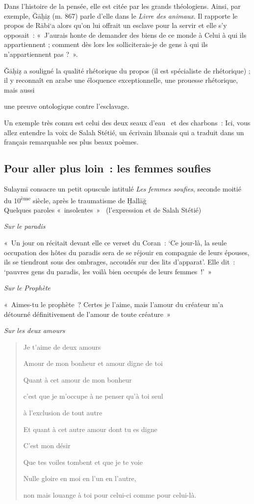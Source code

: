 Dans l'histoire de la pensée, elle est citée par les grands théologiens.
Ainsi, par exemple, Ğāḥiẓ (m. 867) parle d'elle dans le \emph{Livre des
animaux}. Il rapporte le propos de Rābi`a alors qu'on lui offrait un
esclave pour la servir et elle s'y opposait~: «~J'aurais honte de
demander des biens de ce monde à Celui à qui ils appartiennent ; comment
dès lors les solliciterais-je de gens à qui ils n'appartiennent pas ?~».

Ǧāḥiẓ a souligné la qualité rhétorique du propos (il est spécialiste de
rhétorique) ; il y reconnaît en arabe une éloquence exceptionnelle, une
prouesse rhétorique, mais aussi

une preuve ontologique contre l'esclavage.

Un exemple très connu est celui des deux seaux d'eau~ et des charbons~:
Ici, vous allez entendre la voix de Salah Stétié, un écrivain libanais
qui a traduit dans un français remarquable ses plus beaux poèmes.


\subsection{Pour aller plus loin~: les femmes soufies}

Sulaymī consacre un petit opuscule intitulé \emph{Les femmes soufies},
seconde moitié du 10\textsuperscript{ème} siècle, après le traumatisme
de Ḥallāğ \\


Quelques paroles «~insolentes~»~ (l'expression et de Salah Stétié)

\emph{Sur le paradis}

«~Un jour on récitait devant elle ce verset du Coran~: `Ce jour-là, la
seule occupation des hôtes du paradis sera de se réjouir en compagnie de
leurs épouses, ils se tiendront sous des ombrages, accoudés sur des lits
d'apparat'. Elle dit~: `pauvres gens du paradis, les voilà bien occupés
de leurs femmes~!'~»

\emph{Sur le Prophète}~

«~Aimes-tu le prophète~? Certes je l'aime, mais l'amour du créateur m'a
détourné définitivement de l'amour de toute créature~»

\emph{Sur les deux amours}

\begin{quote}
Je t'aime de deux amours

Amour de mon bonheur et amour digne de toi

Quant à cet amour de mon bonheur

c'est que je m'occupe à ne penser qu'à toi seul

à l'exclusion de tout autre

Et quant à cet autre amour dont tu es digne

C'est mon désir

Que tes voiles tombent et que je te voie

Nulle gloire en moi en l'un en l'autre,

non mais louange à toi pour celui-ci comme pour celui-là.
\end{quote}

